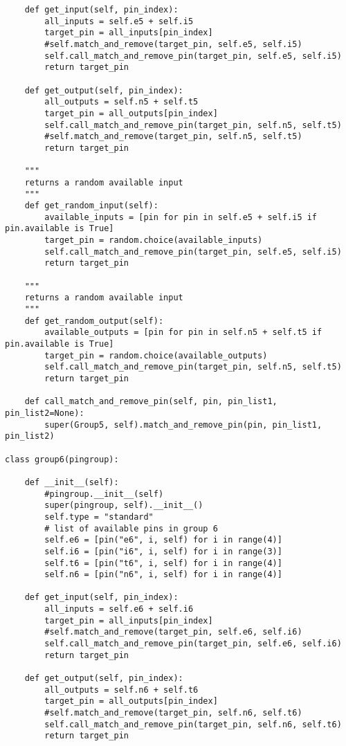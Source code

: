 \documentclass[a4paper]{article}
\begin{document}
\begin{verbatim}
    def get_input(self, pin_index):
        all_inputs = self.e5 + self.i5
        target_pin = all_inputs[pin_index]
        #self.match_and_remove(target_pin, self.e5, self.i5)
        self.call_match_and_remove_pin(target_pin, self.e5, self.i5)
        return target_pin

    def get_output(self, pin_index):
        all_outputs = self.n5 + self.t5
        target_pin = all_outputs[pin_index]
        self.call_match_and_remove_pin(target_pin, self.n5, self.t5)
        #self.match_and_remove(target_pin, self.n5, self.t5)
        return target_pin

    """
    returns a random available input
    """
    def get_random_input(self):
        available_inputs = [pin for pin in self.e5 + self.i5 if pin.available is True]
        target_pin = random.choice(available_inputs)
        self.call_match_and_remove_pin(target_pin, self.e5, self.i5)
        return target_pin

    """
    returns a random available input
    """
    def get_random_output(self):
        available_outputs = [pin for pin in self.n5 + self.t5 if pin.available is True]
        target_pin = random.choice(available_outputs)
        self.call_match_and_remove_pin(target_pin, self.n5, self.t5)
        return target_pin

    def call_match_and_remove_pin(self, pin, pin_list1, pin_list2=None):
        super(Group5, self).match_and_remove_pin(pin, pin_list1, pin_list2)

class group6(pingroup):

    def __init__(self):
        #pingroup.__init__(self)
        super(pingroup, self).__init__()
        self.type = "standard"
        # list of available pins in group 6
        self.e6 = [pin("e6", i, self) for i in range(4)]
        self.i6 = [pin("i6", i, self) for i in range(3)]
        self.t6 = [pin("t6", i, self) for i in range(4)]
        self.n6 = [pin("n6", i, self) for i in range(4)]

    def get_input(self, pin_index):
        all_inputs = self.e6 + self.i6
        target_pin = all_inputs[pin_index]
        #self.match_and_remove(target_pin, self.e6, self.i6)
        self.call_match_and_remove_pin(target_pin, self.e6, self.i6)
        return target_pin

    def get_output(self, pin_index):
        all_outputs = self.n6 + self.t6
        target_pin = all_outputs[pin_index]
        #self.match_and_remove(target_pin, self.n6, self.t6)
        self.call_match_and_remove_pin(target_pin, self.n6, self.t6)
        return target_pin


\end{verbatim}
\end{document}
